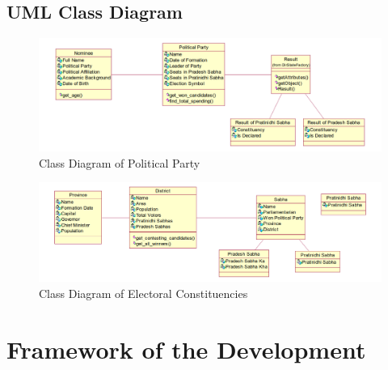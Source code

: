 \documentclass[12pt, a4paper, titlepage]{article}
\begin{document}
\subsection{UML Class Diagram}
\begin{center}
\begin{figure}
	\includegraphics[scale=0.5]{political_party.png}
	\caption{Class Diagram of Political Party}
\end{figure}
\end{center}

\begin{center}
\begin{figure}
\includegraphics[scale=0.5]{Political_division.png}
\caption{Class Diagram of Electoral Constituencies}
\end{figure}
\end{center}
\newpage

\section{Framework of the Development}
\end{document}

